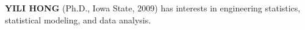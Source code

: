 \documentclass{scspaperproc}
\theoremstyle{scsthe}
\begin{document}
\textbf{\uppercase{Yili Hong}} (Ph.D., Iowa State, 2009) has interests in
engineering statistics, statistical modeling, and data analysis.




\end{document}
